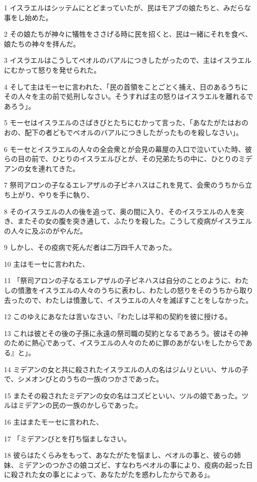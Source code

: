 \par 1 イスラエルはシッテムにとどまっていたが、民はモアブの娘たちと、みだらな事をし始めた。
\par 2 その娘たちが神々に犠牲をささげる時に民を招くと、民は一緒にそれを食べ、娘たちの神々を拝んだ。
\par 3 イスラエルはこうしてペオルのバアルにつきしたがったので、主はイスラエルにむかって怒りを発せられた。
\par 4 そして主はモーセに言われた、「民の首領をことごとく捕え、日のあるうちにその人々を主の前で処刑しなさい。そうすれば主の怒りはイスラエルを離れるであろう」。
\par 5 モーセはイスラエルのさばきびとたちにむかって言った、「あなたがたはおのおの、配下の者どもでペオルのバアルにつきしたがったものを殺しなさい」。
\par 6 モーセとイスラエルの人々の全会衆とが会見の幕屋の入口で泣いていた時、彼らの目の前で、ひとりのイスラエルびとが、その兄弟たちの中に、ひとりのミデアンの女を連れてきた。
\par 7 祭司アロンの子なるエレアザルの子ピネハスはこれを見て、会衆のうちから立ち上がり、やりを手に執り、
\par 8 そのイスラエルの人の後を追って、奥の間に入り、そのイスラエルの人を突き、またその女の腹を突き通して、ふたりを殺した。こうして疫病がイスラエルの人々に及ぶのがやんだ。
\par 9 しかし、その疫病で死んだ者は二万四千人であった。
\par 10 主はモーセに言われた、
\par 11 「祭司アロンの子なるエレアザルの子ピネハスは自分のことのように、わたしの憤激をイスラエルの人々のうちに表わし、わたしの怒りをそのうちから取り去ったので、わたしは憤激して、イスラエルの人々を滅ぼすことをしなかった。
\par 12 このゆえにあなたは言いなさい、『わたしは平和の契約を彼に授ける。
\par 13 これは彼とその後の子孫に永遠の祭司職の契約となるであろう。彼はその神のために熱心であって、イスラエルの人々のために罪のあがないをしたからである』と」。
\par 14 ミデアンの女と共に殺されたイスラエルの人の名はジムリといい、サルの子で、シメオンびとのうちの一族のつかさであった。
\par 15 またその殺されたミデアンの女の名はコズビといい、ツルの娘であった。ツルはミデアンの民の一族のかしらであった。
\par 16 主はまたモーセに言われた、
\par 17 「ミデアンびとを打ち悩ましなさい。
\par 18 彼らはたくらみをもって、あなたがたを悩まし、ペオルの事と、彼らの姉妹、ミデアンのつかさの娘コズビ、すなわちペオルの事により、疫病の起った日に殺された女の事とによって、あなたがたを惑わしたからである」。


